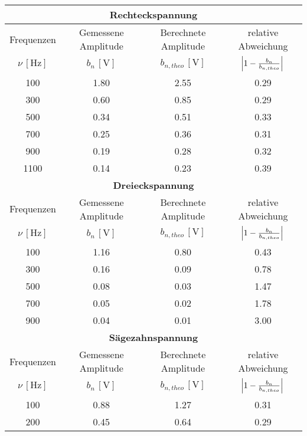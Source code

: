 \begin{table}[!h]
	\centering
	\begin{tabular}{|c|c|c|c|}
		\hline
		\multicolumn{4}{|c|}{\bfseries Rechteckspannung} \\\hline
		Frequenzen & Gemessene Amplitude & Berechnete Amplitude & relative Abweichung \\ 
		$\nu\,[\si{\hertz}]$ & $b_{n}\,[\si{\volt}]$ & $b_{n,theo}\,[\si{\volt}]$ & $\envert{1 - \tfrac{b_{n}}{b_{n,theo}}}$  \\\hline\hline
		\num{100}  & \num{1.80}  & \num{2.55}  & \num{0.29}  \\ 
		\num{300}  & \num{0.60}  & \num{0.85}  & \num{0.29}  \\ 
		\num{500}  & \num{0.34} & \num{0.51}  & \num{0.33} \\
		\num{700}  & \num{0.25} & \num{0.36}  & \num{0.31} \\ 
		\num{900}  & \num{0.19} & \num{0.28}  & \num{0.32} \\ 
		\num{1100} & \num{0.14} & \num{0.23}  & \num{0.39} \\\hline
		\multicolumn{4}{|c|}{\bfseries Dreieckspannung}\\\hline
		Frequenzen & Gemessene Amplitude & Berechnete Amplitude & relative Abweichung\\
		$\nu\,[\si{\hertz}]$ & $b_{n}\,[\si{\volt}]$ & $b_{n,theo}\,[\si{\volt}]$& $\envert{1 - \tfrac{b_{n}}{b_{n,theo}}}$ \\\hline\hline
		\num{100}  & \num{1.16}  & \num{0.80} & \num{0.43}\\
		\num{300}  & \num{0.16}  & \num{0.09} & \num{0.78}\\
		\num{500}  & \num{0.08}  & \num{0.03} & \num{1.47}\\
		\num{700}  & \num{0.05}  & \num{0.02} & \num{1.78}\\
		\num{900}  &\num{0.04}  & \num{0.01} & \num{3.00}\\
		\hline
		\multicolumn{4}{|c|}{\bfseries Sägezahnspannung}  \\\hline
		Frequenzen & Gemessene Amplitude & Berechnete Amplitude & relative Abweichung \\
		$\nu\,[\si{\hertz}]$ & $b_{n}\,[\si{\volt}]$ & $b_{n,theo}\,[\si{\volt}]$ & $\envert{1 - \tfrac{b_{n}}{b_{n,theo}}}$ \\\hline\hline
		\num{100}  & \num{0.88}  & \num{1.27} & \num{0.31} \\
		\num{200}  & \num{0.45}  & \num{0.64} & \num{0.29} \\

\end{tabular}
\end{table}
